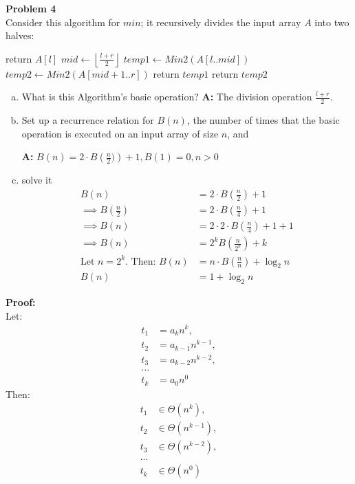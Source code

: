 \documentclass[11pt]{article}
\begin{document}
\noindent\textbf{Problem 4} \\
Consider this algorithm for $min$; it recursively divides the input array 
$A$ into two halves:
\begin{algorithm}
\begin{algorithmic}
\State return $A[l]$
\EndIf
\State $mid \gets \left \lfloor\frac{l + r}{2}\right \rfloor$
\State $temp1 \gets Min2(A[l..mid])$
\State $temp2 \gets Min2(A[mid+1..r])$
\State return $temp1$
\Else
\State return $temp2$
\EndIf
\EndProcedure
\end{algorithmic}
\end{algorithm}
\begin{enumerate}[(a)]
\item What is this Algorithm’s basic operation? 
\textbf{ A: } 
The division operation $\frac{l + r}{2}$.
\item Set up a recurrence relation for $B(n)$, the number of times that 
the basic operation is executed on an input array of size $n$, and

\textbf{ A: }
$B(n) = 2 \cdot B\left(\frac{n}{2})\right) + 1, B(1) = 0, n > 0$
\item solve it
\begin{align*}
B(n) &= 2 \cdot B\left(\frac{n}{2}\right) + 1\\
\implies B\left(\frac{n}{2}\right) &= 2 \cdot B\left(\frac{n}{4}\right) + 1\\
\implies B(n) &= 2 \cdot 2 \cdot B\left(\frac{n}{4}\right) + 1 + 1\\
\implies B(n) &= 2^k B\left(\frac{n}{2^k}\right) + k\\
\text{Let } n = 2^k. \text{ Then: } 
B(n) &= n \cdot B\left(\frac{n}{n}\right) + \log_2n\\
B(n) &= 1 + \log_2n
\end{align*}
\end{enumerate}
\noindent\textbf{Proof:}\\
Let: 
\begin{align*}
t_1 &= a_kn^k, \\
t_2 &= a_{k-1}n^{k-1}, \\
t_3 &= a_{k-2}n^{k-2}, \\ 
...\\
t_k &= a_0n^0
\end{align*}
Then:
\begin{align*}
t_1 &\in \Theta(n^k),\\
t_2 &\in \Theta(n^{k-1}),\\
t_3 &\in \Theta(n^{k-2}),\\
...\\
t_k &\in \Theta(n^0)
\end{align*}
\end{document}
